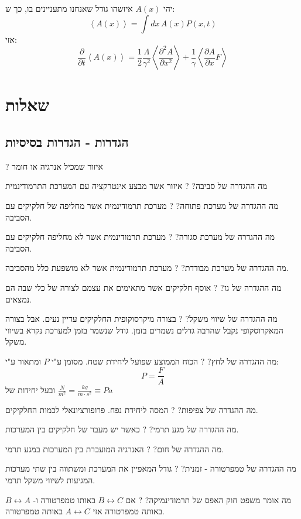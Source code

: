 \documentclass{tstextbook}
\begin{document}
\begin{proposition}
יהי \(A(x)\) איזשהו גודל שאנחנו מתעניינים בו, כך ש:
$$\left\langle A\left(x\right)\right\rangle=\int d x\,A\left(x\right)P\left(x,t\right)$$
אזי:
$$\frac{\partial}{\partial t}\left\langle A\left(x\right)\right\rangle=\frac{1}{2}\frac{\Lambda}{\gamma^{2}}\left\langle\frac{\partial^{2}A}{\partial x^{2}}\right\rangle+\frac{1}{\gamma}\left\langle\frac{\partial A}{\partial x}F\right\rangle$$

\end{proposition}
\chapter{שאלות}

\section{הגדרות - הגדרות בסיסיות}

?
איזור שמכיל אנרגיה או חומר

מה ההגדרה של סביבה?
?
איזור אשר מבצע אינטרקציה עם המערכת התרמודינמית

מה ההגדרה של מערכת פתוחה?
?
מערכת תרמודינמית אשר מחליפה של חלקיקים עם הסביבה.

מה ההגדרה של מערכת סגורה?
?
מערכת תרמודינמית אשר לא מחליפה חלקיקים עם הסביבה.

מה ההגדרה של מערכת מבודדת?
?
מערכת תרמודינמית אשר לא מושפעת כלל מהסביבה.

מה ההגדרה של גז?
?
אוסף חלקיקים אשר מתאימים את עצמם לצורה של כלי שבה הם נמצאים.

מה ההגדרה של שיווי משקל?
?
בצורה מיקרסוקופית החלקיקים עדיין נעים. אבל בצורה המאקרוסקופי נקבל שהרבה גדלים נשמרים בזמן. גודל שנשמר בזמן למערכת נקרא בשיווי משקל.

מה ההגדרה של לחץ?
?
הכוח הממוצע שפועל ליחידת שטח. מסומן ע"י \(P\) ומתאור ע"י:
$$P= \frac{F}{A}$$
ובעל יחידות של \(\frac{N}{m^2}=\frac{kg}{m\cdot s^2}\equiv Pa\)

מה ההגדרה של צפיפות?
?
המסה ליחידת נפח. פרופורציונאלי לכמות החלקיקים.

מה ההגדרה של מגע תרמי?
?
כאשר יש מעבר של חלקיקים בין המערכות.

מה ההגדרה של חום?
?
האנרגיה המועברת בין המערכות במגע תרמי.

מה ההגדרה של טמפרטורה - זמנית?
?
גודל המאפיין את המערכת ומשתווה בין שתי מערכות המגיעות לשיווי משקל תרמי.

מה אומר משפט חוק האפס של תרמודינמיקה?
?
אם \(B\leftrightarrow C\) באותו טמפרטורה ו- \(B\leftrightarrow A\) באותה טמפרטורה אזי \(A\leftrightarrow C\) באותה טמפרטורה.
\end{document}
